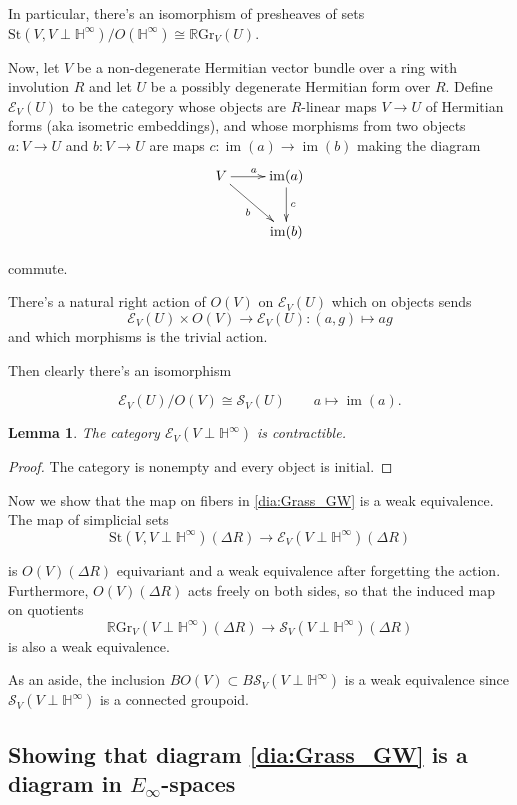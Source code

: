 \documentclass[edeposit,fullpage]{uiucthesis2009}
\newcommand{\mbb}{\mathbb}
\newcommand{\mc}{\mathcal}
\newcommand{\RGr}{\mathbb R\mathrm{Gr}}
\newcommand{\St}{\mathrm{St}}
\DeclareMathOperator*{\im}{im}
\theoremstyle{plain}
\newtheorem{lemma}{Lemma}
\numberwithin{lemma}{section}
\theoremstyle{definition}
\begin{document}
In particular, there's an isomorphism of presheaves of sets $\St(V,V \perp \mbb
H^\infty)/O(\mbb H^\infty) \cong \RGr_V(U)$.

Now, let $V$ be a non-degenerate Hermitian vector bundle over a ring with
involution $R$ and let $U$ be a possibly degenerate Hermitian form
over $R$. Define $\mc E_V(U)$ to be the category whose objects are
$R$-linear maps $V \rightarrow U$ of Hermitian forms (aka isometric embeddings), and whose
morphisms from two objects $a : V \rightarrow U$ and $b : V
\rightarrow U$ are maps $c : \im(a) \rightarrow \im(b)$ making the
diagram
\[
\xymatrix{V \ar[r]^a\ar[dr]_b & \im(a) \ar[d]^c\\ & \im(b)}
\]

commute.

There's a natural right action of $O(V)$ on $\mc E_V(U)$ which on
objects sends
\[
\mc E_V(U) \times O(V) \rightarrow \mc E_V(U) : (a,g) \mapsto ag
\]
and which morphisms is the trivial action.

Then clearly there's an isomorphism

\[
\mc E_V(U)/O(V) \cong \mc S_V(U) \qquad a \mapsto \im(a).
\] 

\begin{lemma}
The category $\mc E_V(V \perp \mbb H^\infty)$ is contractible.
\end{lemma}

\begin{proof}
The category is nonempty and every object is initial.
\end{proof}

Now we show that the map on fibers in \ref{dia:Grass_GW} is a weak
equivalence. The map of simplicial sets
\[
\St(V,V\perp \mbb H^\infty)(\Delta R) \rightarrow \mc E_V(V \perp \mbb
H^\infty)(\Delta R)
\]

is $O(V)(\Delta R)$ equivariant and a weak equivalence after
forgetting the action. Furthermore, $O(V)(\Delta R)$ acts freely on
both sides, so that the induced map on quotients 
\begin{equation}\label{eq:RGr_Sv}
\RGr_V(V \perp \mbb
H^\infty)({\Delta R}) \rightarrow \mc S_V(V \perp \mbb
H^\infty)(\Delta R)
\end{equation}
 is also a weak equivalence. 

As an aside, the inclusion $BO(V) \subset B\mc S_V(V \perp \mbb
H^\infty)$ is a weak equivalence since $\mc S_V(V \perp \mbb
H^\infty)$ is a connected groupoid. 

\subsection{Showing that diagram \ref{dia:Grass_GW} is a diagram in
  $E_\infty$-spaces}
\end{document}
